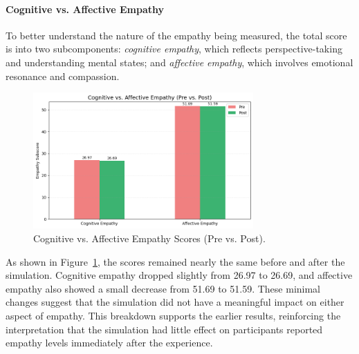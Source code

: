 \paragraph{Cognitive vs. Affective Empathy}

To better understand the nature of the empathy being measured, the total score is into two subcomponents: \textit{cognitive empathy}, which reflects perspective-taking and understanding mental states; and \textit{affective empathy}, which involves emotional resonance and compassion.

\begin{figure}[htbp]
    \centering
    \includegraphics[width=0.75\textwidth]{../../Figures/cog-vs-affect.png}
    \caption{Cognitive vs. Affective Empathy Scores (Pre vs. Post).}
    \label{fig:empathy_cog_aff}
\end{figure}

\vspace{1em}

As shown in Figure~\ref{fig:empathy_cog_aff}, the scores remained nearly the same before and after the simulation. Cognitive empathy dropped slightly from 26.97 to 26.69, and affective empathy also showed a small decrease from 51.69 to 51.59. These minimal changes suggest that the simulation did not have a meaningful impact on either aspect of empathy. This breakdown supports the earlier results, reinforcing the interpretation that the simulation had little effect on participants reported empathy levels immediately after the experience.



